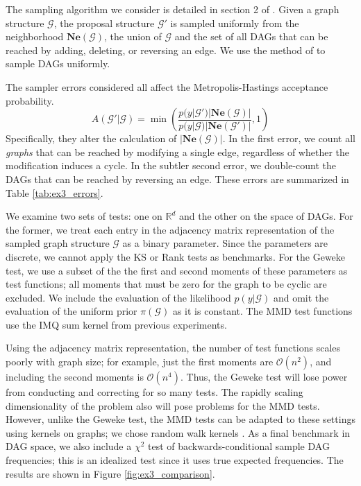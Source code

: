 \documentclass{article}
\begin{document}
The sampling algorithm we consider is detailed in section 2 of \cite{grzegorczyk_improving_2008}. 
Given a graph structure $\mathcal{G}$, the proposal structure $\mathcal{G}'$ is sampled uniformly from the neighborhood $\mathbf{Ne}(\mathcal{G})$, the union of $\mathcal{G}$ and the set of all DAGs that can be reached by adding, deleting, or reversing an edge. We use the method of \cite{kuipers_uniform_2015} to sample DAGs uniformly.

The sampler errors considered all affect the Metropolis-Hastings acceptance probability.
\begin{equation}
A(\mathcal{G}'|\mathcal{G}) = \min{\left(\frac{p(y|\mathcal{G}')|\mathbf{Ne}(\mathcal{G})|}{p(y|\mathcal{G})|\mathbf{Ne}(\mathcal{G}')|}, 1\right)}
\end{equation}
Specifically, they alter the calculation of $|\mathbf{Ne}(\mathcal{G})|$. In the first error, we count all \textit{graphs} that can be reached by modifying a single edge, regardless of whether the modification induces a cycle. In the subtler second error, we double-count the DAGs that can be reached by reversing an edge. These errors are summarized in Table \ref{tab:ex3_errors}.

We examine two sets of tests: one on $\mathbb{R}^{d}$ and the other on the space of DAGs. For the former, we treat each entry in the adjacency matrix representation of the sampled graph structure $\mathcal{G}$ as a binary parameter. Since the parameters are discrete, we cannot apply the KS or Rank tests as benchmarks. For the Geweke test, we use a subset of the the first and second moments of these parameters as test functions; all moments that must be zero for the graph to be cyclic are excluded. We include the evaluation of the likelihood $p(y|\mathcal{G})$ and omit the evaluation of the uniform prior $\pi(\mathcal{G})$ as it is constant. The MMD test functions use the IMQ sum kernel from previous experiments.

Using the adjacency matrix representation, the number of test functions scales poorly with graph size; for example, just the first moments are $\mathcal{O}(n^2)$, and including the second moments is $\mathcal{O}(n^4)$. Thus, the Geweke test will lose power from conducting and correcting for so many tests. The rapidly scaling dimensionality of the problem also will pose problems for the MMD tests. However, unlike the Geweke test, the MMD tests can be adapted to these settings using kernels on graphs; we chose random walk kernels \citep{gartner_graph_2003, vishwanathan_fast_2006}. As a final benchmark in DAG space, we also include a $\chi^{2}$ test of backwards-conditional sample DAG frequencies; this is an idealized test since it uses true expected frequencies. The results are shown in Figure \ref{fig:ex3_comparison}. 
\end{document}
